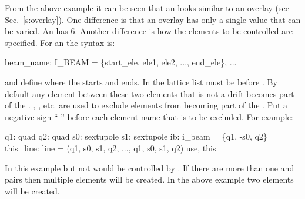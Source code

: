 From the above example it can be seen that an  looks similar to
an overlay (see Sec.~\ref{s:overlay}). One difference is that an
overlay has only a single value that can be varied. An  has
6.  Another difference is how the elements to be controlled are
specified. For an  the syntax is:
\begin{example}
  beam_name: I_BEAM = \{start_ele, ele1, ele2, ..., end_ele\}, ...
\end{example}
 and  define where the  starts
and ends. In the lattice list  must be before
. By default any element between these two elements that
is not a drift becomes part of the . , ,
etc. are used to exclude elements from becoming part of the
.  Put a negative sign ``-'' before each element name that
is to be excluded. For example:
\begin{example}
  q1: quad
  q2: quad
  s0: sextupole
  s1: sextupole
  ib: i_beam = \{q1, -s0, q2\}
  this_line: line = (q1, s0, s1, q2, ..., q1, s0, s1, q2)
  use, this
\end{example}
In this example  but not  would be controlled by
.  If there are more than one  and 
pairs then multiple  elements will be created. In the above
example two  elements will be created.

